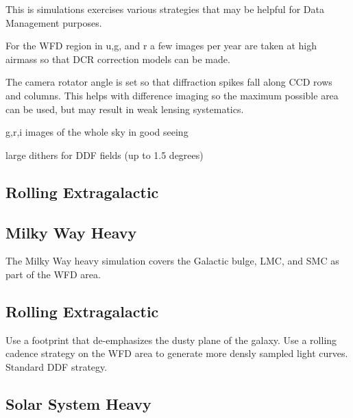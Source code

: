 This is simulations exercises various strategies that may be helpful for Data Management purposes. 

For the WFD region in u,g, and r a few images per year are taken at high airmass so that DCR correction models can be made.

The camera rotator angle is set so that diffraction spikes fall along CCD rows and columns. This helps with difference imaging so the maximum possible area can be used, but may result in weak lensing systematics.

g,r,i images of the whole sky in good seeing

large dithers for DDF fields (up to 1.5 degrees)


\subsection{Rolling Extragalactic}

\begin{figure}
\caption{}\label{fig:exgalroll}
\end{figure}


\subsection{Milky Way Heavy}

The Milky Way heavy simulation covers the Galactic bulge, LMC, and SMC as part of the WFD area.  

\subsection{Rolling Extragalactic}




Use a footprint that de-emphasizes the dusty plane of the galaxy. Use a rolling cadence strategy on the WFD area to generate more densly sampled light curves. Standard DDF strategy.


\subsection{Solar System Heavy}


